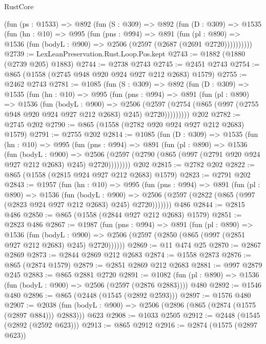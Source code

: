\begin{lexlean}{RustCore}
\begin{coremodule}
{\begin{coremodule}
{{{{{{{{    (fun (ps : @1533) =>
    @892
      (fun (S : @309) =>
      @892
        (fun (D : @309) =>
        @1535
          (fun (hn : @10) =>
          @995
            (fun (pns : @994) =>
            @891
              (fun (pl : @890) =>
              @1536 (fun (bodyL : @900) => @2506 (@2597 (@2687 (@2691 @2720))))))))))
@2739 := LexLeanPreservation.Rust.Loop.Pos.kept
@2743 := @1882 (@1880 (@2739 @205) @1883)
@2744 := @2738 @2743
@2745 := @2451 @2743
@2754 := @865 (@1558 (@2745 @948 @920 @924 @927 @212 @2683) @1579)
@2755 := @2462 @2743
@2781 := @1085
    (fun (S : @309) =>
    @892
      (fun (D : @309) =>
      @1535
        (fun (hn : @10) =>
        @995
          (fun (pns : @994) =>
          @891
            (fun (pl : @890) =>
            @1536
              (fun (bodyL : @900) =>
              @2506
                (@2597
                  (@2754 (@865 (@997 (@2755 @948 @920 @924 @927 @212 @2683) @245) @2720)))))))))
    @202
@2782 := @2745 @202
@2790 := @865 (@1558 (@2782 @920 @924 @927 @212 @2683) @1579)
@2791 := @2755 @202
@2814 := @1085
    (fun (D : @309) =>
    @1535
      (fun (hn : @10) =>
      @995
        (fun (pns : @994) =>
        @891
          (fun (pl : @890) =>
          @1536
            (fun (bodyL : @900) =>
            @2506 (@2597 (@2790 (@865 (@997 (@2791 @920 @924 @927 @212 @2683) @245) @2720))))))))
    @202
@2815 := @2782 @202
@2822 := @865 (@1558 (@2815 @924 @927 @212 @2683) @1579)
@2823 := @2791 @202
@2843 := @1957
    (fun (hn : @10) =>
    @995
      (fun (pns : @994) =>
      @891
        (fun (pl : @890) =>
        @1536
          (fun (bodyL : @900) =>
          @2506 (@2597 (@2822 (@865 (@997 (@2823 @924 @927 @212 @2683) @245) @2720)))))))
    @486
@2844 := @2815 @486
@2850 := @865 (@1558 (@2844 @927 @212 @2683) @1579)
@2851 := @2823 @486
@2867 := @1987
    (fun (pns : @994) =>
    @891
      (fun (pl : @890) =>
      @1536
        (fun (bodyL : @900) =>
        @2506 (@2597 (@2850 (@865 (@997 (@2851 @927 @212 @2683) @245) @2720))))))
@2869 := @11 @474 @25
@2870 := @2867 @2869
@2873 := @2844 @2869 @212 @2683
@2874 := @1558 @2873
@2876 := @865 (@2874 @1579)
@2879 := @2851 @2869 @212 @2683
@2881 := @997 @2879 @245
@2883 := @865 @2881 @2720
@2891 := @1082 (fun (pl : @890) => @1536 (fun (bodyL : @900) => @2506 (@2597 (@2876 @2883)))) @480
@2892 := @1546 @480
@2896 := @865 (@2448 (@1545 (@2892 @2593)))
@2897 := @1576 @480
@2907 := @2038 (fun (bodyL : @900) => @2506 (@2896 (@865 (@2874 (@1575 (@2897 @884))) @2883))) @623
@2908 := @1033 @2505
@2912 := @2448 (@1545 (@2892 (@2592 @623)))
@2913 := @865 @2912
@2916 := @2874 (@1575 (@2897 @623))
}}}}}}}}
\end{coremodule}}
\end{coremodule}
\end{lexlean}
